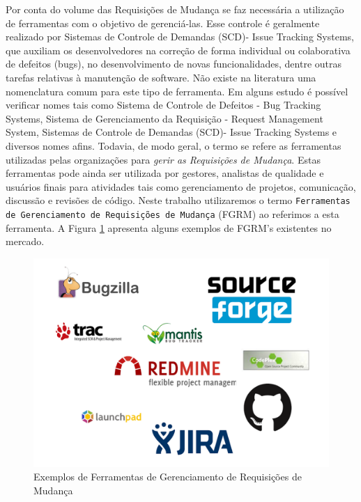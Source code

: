 \documentclass[msc,proposal,hidelot,hideabstract]{ppgccufmg} %
\begin{document}

Por conta do volume das Requisições de Mudança se faz necessária a utilização de ferramentas com o objetivo de gerenciá-las. Esse controle é geralmente realizado por Sistemas de Controle de Demandas (SCD)- Issue Tracking Systems, que auxiliam os desenvolvedores na correção de forma individual ou colaborativa de defeitos (bugs), no desenvolvimento de novas funcionalidades, dentre outras tarefas relativas à manutenção de software. Não existe na literatura uma nomenclatura comum para este tipo de ferramenta. Em alguns estudo é possível verificar nomes tais como Sistema de Controle de Defeitos - Bug Tracking Systems, Sistema de Gerenciamento da Requisição - Request Management System, Sistemas de Controle de Demandas (SCD)- Issue Tracking Systems e diversos nomes afins. Todavia, de modo geral, o termo se refere as ferramentas utilizadas pelas organizações para \textit{gerir as Requisições de Mudança}. Estas ferramentas pode ainda ser utilizada por gestores, analistas de qualidade e usuários finais para atividades tais como gerenciamento de projetos, comunicação, discussão e revisões de código. Neste trabalho utilizaremos o termo \texttt{Ferramentas de Gerenciamento de Requisições de Mudança} (FGRM) ao referimos a esta ferramenta. A Figura \ref{fig:issue-tracking-sytem} apresenta alguns exemplos de FGRM's existentes no mercado.

\begin{figure}
\centering
\includegraphics[width=0.7\linewidth]{../img/issue-tracking-sytem}
\caption{Exemplos de Ferramentas de Gerenciamento de Requisições de Mudança}
\label{fig:issue-tracking-sytem}
\end{figure}



\end{document}
